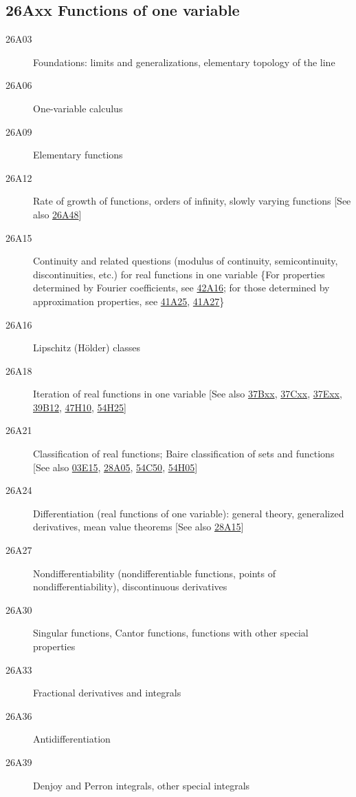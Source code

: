 \documentclass[letterpaper]{article}
\begin{document}
\subsection*{26Axx  Functions of one variable }\label{26Axx}
\begin{description}  
\item [26A03]\label{26A03} Foundations: limits and generalizations, elementary topology of the line
\item [26A06]\label{26A06} One-variable calculus 
\item [26A09]\label{26A09} Elementary functions
\item [26A12]\label{26A12} Rate of growth of functions, orders of infinity, slowly varying functions [See also \hyperref[26A48]{26A48}]
\item [26A15]\label{26A15} Continuity and related questions (modulus of continuity, semicontinuity, discontinuities, etc.) for real functions in one variable \{For properties determined by Fourier coefficients, see \hyperref[42A16]{42A16}; for those determined by approximation properties, see \hyperref[41A25]{41A25}, \hyperref[41A27]{41A27}\}
\item [26A16]\label{26A16} Lipschitz (H\"{o}lder) classes
\item [26A18]\label{26A18} Iteration of real functions in one variable [See also \hyperref[37Bxx]{37Bxx}, \hyperref[37Cxx]{37Cxx}, \hyperref[37Exx]{37Exx}, \hyperref[39B12]{39B12}, \hyperref[47H10]{47H10}, \hyperref[54H25]{54H25}]
\item [26A21]\label{26A21} Classification of real functions; Baire classification of sets and functions [See also \hyperref[03E15]{03E15}, \hyperref[28A05]{28A05}, \hyperref[54C50]{54C50}, \hyperref[54H05]{54H05}]
\item [26A24]\label{26A24} Differentiation (real functions of one variable): general theory, generalized derivatives, mean value theorems [See also \hyperref[28A15]{28A15}]
\item [26A27]\label{26A27} Nondifferentiability (nondifferentiable functions, points of nondifferentiability), discontinuous derivatives
\item [26A30]\label{26A30} Singular functions, Cantor functions, functions with other special properties
\item [26A33]\label{26A33} Fractional derivatives and integrals
\item [26A36]\label{26A36} Antidifferentiation
\item [26A39]\label{26A39} Denjoy and Perron integrals, other special integrals

\end{description}
\end{document}
